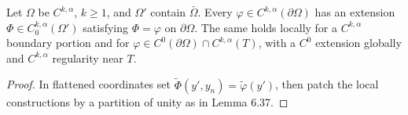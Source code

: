 \begin{lemma}
\label{gt-ch06-lem-6-38}
Let $\Omega$ be $C^{k,\alpha}$, $k\ge1$, and $\Omega'$ contain $\bar\Omega$.
Every $\varphi\in C^{k,\alpha}(\partial\Omega)$ has an extension
$\Phi\in C_0^{k,\alpha}(\Omega')$ satisfying $\Phi=\varphi$ on $\partial\Omega$.
The same holds locally for a $C^{k,\alpha}$ boundary portion and for
$\varphi\in C^0(\partial\Omega)\cap C^{k,\alpha}(T)$, with a $C^0$ extension
globally and $C^{k,\alpha}$ regularity near $T$.
\end{lemma}
\begin{proof}
\sketch In flattened coordinates set $\widetilde\Phi(y',y_n)=\widetilde\varphi(y')$,
then patch the local constructions by a partition of unity as in Lemma 6.37.
\end{proof}
